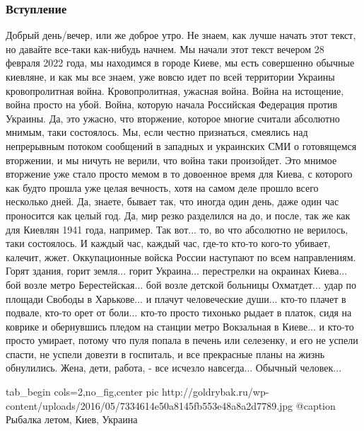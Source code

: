  
 
 
 
 

\subsubsection{Вступление}

Добрый день/вечер, или же доброе утро. Не знаем, как лучше начать этот текст,
но давайте все-таки как-нибудь начнем. Мы начали этот текст вечером 28 февраля
2022 года, мы находимся в городе Киеве, мы есть совершенно обычные киевляне, и
как мы все знаем, уже вовсю идет по всей территории Украины кровопролитная
война. Кровопролитная, ужасная война. Война на истощение, война просто на
убой. Война, которую начала Российская Федерация против Украины. Да, это
ужасно, что вторжение, которое многие считали абсолютно мнимым, таки
состоялось. Мы, если честно признаться, смеялись над непрерывным потоком
сообщений в западных и украинских СМИ о готовящемся вторжении, и мы ничуть не
верили, что война таки произойдет. Это мнимое вторжение уже стало просто мемом
в то довоенное время для Киева, с которого как будто прошла уже целая вечность, хотя на
самом деле прошло всего несколько дней. Да, знаете, бывает так, что иногда один
день, даже один час проносится как целый год. Да, мир резко разделился на до, и
после, так же как для Киевлян 1941 года, например. Так вот... то, во что
абсолютно не верилось, таки состоялось. И каждый час, каждый час, где-то кто-то
кого-то убивает, калечит, жжет. Оккупационные войска России наступают по всем
направлениям. Горят здания, горит земля... горит Украина... перестрелки на
окраинах Киева...  бой возле метро Берестейская... бой возле детской больницы
Охматдет... удар по площади Свободы в Харькове...  и плачут человеческие
души...  кто-то плачет в подвале, кто-то орет от боли...  кто-то просто
тихонько рыдает в платок, сидя на коврике и обернувшись пледом на станции метро
Вокзальная в Киеве... и кто-то просто умирает, потому что пуля попала в печень
или селезенку, и его не успели спасти, не успели довезти в госпиталь, и все
прекрасные планы на жизнь обнулились.  Жена, дети, работа, - все исчезло
навсегда... Обычный человек...

\ifcmt
  tab_begin cols=2,no_fig,center
		 pic http://goldrybak.ru/wp-content/uploads/2016/05/7334614e50a8145fb553e48a8a2d7789.jpg
		 @caption Рыбалка летом, Киев, Украина

